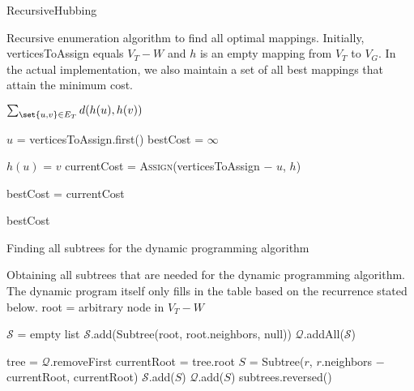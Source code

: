 \begin{algorithm}
    \caption{RecursiveHubbing}
    \label{alg:TriangulateStar}
    \begin{algorithmic}[1]
        \Statex Recursive enumeration algorithm to find all optimal mappings. Initially, verticesToAssign equals $V_T - W$ and $h$ is an empty mapping from $V_T$ to $V_G$. In the actual implementation, we also maintain a set of all best mappings that attain the minimum cost.

                \State \Return $\sum_{\set{u, v} \in E_T} d(h(u), h(v))$ 
            \EndIf

            \State $u$ = verticesToAssign.first()
            \State bestCost = $\infty$

                \State $h(u)$ = $v$
                \State currentCost = \textsc{Assign}(verticesToAssign $-$ $u$, $h$)

                    \State bestCost = currentCost
                \EndIf
            \EndFor

            \State \Return bestCost
        \EndProcedure
    \end{algorithmic}
\end{algorithm}

\begin{algorithm}
    \caption{Finding all subtrees for the dynamic programming algorithm}
    \label{alg:idk}
    \begin{algorithmic}[1]
        \Statex Obtaining all subtrees that are needed for the dynamic programming algorithm.
        The dynamic program itself only fills in the table based on the recurrence stated below.
            \State root = arbitrary node in $V_T - W$

            \State $\mathcal S$ = empty list
            \State $\mathcal S$.add(Subtree(root, root.neighbors, null)) 
            \State $\mathcal Q$.addAll($\mathcal S$)

                \State tree = $\mathcal Q$.removeFirst
                \State currentRoot = tree.root
                    \State $S$ = Subtree($r$, $r$.neighbors $-$ currentRoot, currentRoot)
                    \State $\mathcal S$.add($S$)
                    \State $\mathcal Q$.add($S$)
                \EndFor
            \EndWhile
            \State \Return subtrees.reversed()
        \EndProcedure
    \end{algorithmic}
\end{algorithm}

